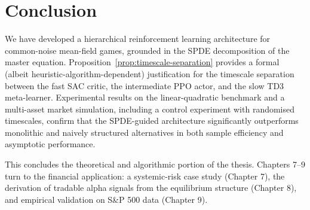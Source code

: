 \section{Conclusion}
\label{sec:hrl-conclusion}

We have developed a hierarchical reinforcement learning architecture for
common-noise mean-field games, grounded in the SPDE decomposition of the master
equation. Proposition~\ref{prop:timescale-separation} provides a formal (albeit
heuristic-algorithm-dependent) justification for the timescale separation between
the fast SAC critic, the intermediate PPO actor, and the slow TD3 meta-learner.
Experimental results on the linear-quadratic benchmark and a multi-asset market
simulation, including a control experiment with randomised timescales, confirm that
the SPDE-guided architecture significantly outperforms monolithic and naively
structured alternatives in both sample efficiency and asymptotic performance.

This concludes the theoretical and algorithmic portion of the thesis. Chapters 7--9
turn to the financial application: a systemic-risk case study (Chapter 7), the
derivation of tradable alpha signals from the equilibrium structure (Chapter 8), and
empirical validation on S\&P 500 data (Chapter 9).
